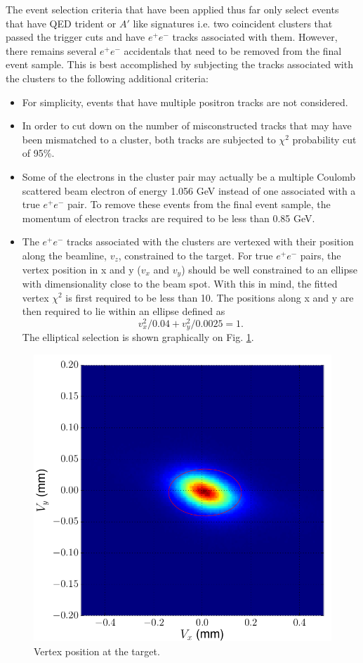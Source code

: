 The event selection criteria that have been applied thus far only select 
events that have QED trident or $A'$ like signatures i.e. two coincident clusters that
passed the trigger cuts and have $e^+e^-$ tracks associated with them.  However, 
there remains several $e^+e^-$ accidentals that need to be removed from the final 
event sample.  This is best accomplished by subjecting the tracks associated 
with the clusters to the following additional criteria:
\begin{itemize}
    \item For simplicity, events that have multiple positron tracks are not 
          considered.
    \item In order to cut down on the number of misconstructed tracks that may
          have been mismatched to a cluster, both tracks are subjected to 
          $\chi^2$ probability cut of 95\%.
    \item Some of the electrons in the cluster pair may actually be a multiple
          Coulomb scattered beam electron of energy 1.056 GeV 
          instead of one associated with a true $e^+e^-$ 
          pair.  To remove these events from the final event sample, the 
          momentum of electron tracks are required to be less than 0.85 GeV.
    \item The $e^+e^-$ tracks associated with the clusters are vertexed with 
          their position along the beamline, $v_z$, constrained to the target. 
          For true $e^+e^-$ pairs, the vertex position in x and y ($v_x$ and $v_y$) should be
          well constrained to an ellipse with dimensionality close to the beam 
          spot.  With this in mind, the fitted vertex $\chi^2$ is first required 
          to be less than 10.  The positions along x and y are then required 
          to lie within an ellipse 
          defined as
          \[
                v_x^2/0.04 + v_y^2/0.0025  = 1.
          \]
          The elliptical selection is shown graphically on Fig. \ref{fig:vertex_xy}.
\end{itemize}
\begin{figure}[t]
    \centering
    \includegraphics[width=.7\textwidth]{images/20160503_vertex_xy.png}
    \caption{Vertex position at the target.}
    \label{fig:vertex_xy}
\end{figure}  

